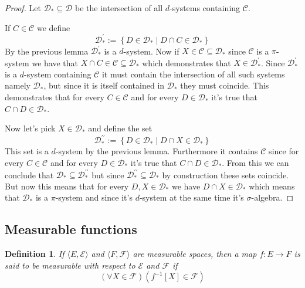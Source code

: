 \documentclass[a4paper]{amsart}
\newtheorem{deff}{Definition}
\newcommand{\pair}[2]{\langle #1, #2\rangle}
\begin{document}
\begin{proof}
    Let $\mathcal{D}_* \subseteq \mathcal{D}$ be the intersection of all $d$-systems containing  $\mathcal{C}$.
    
    If $C \in \mathcal{C}$ we define 
    $$ \mathcal{D}_*^\prime := \left\{ D \in \mathcal{D}_* \mid D \cap C \in \mathcal{D}_* \right\}$$
    By the previous lemma $\mathcal{D}_*^\prime$ is a $d$-system.
    Now if $X \in \mathcal{C}  \subseteq \mathcal{D}_* $ 
    since $\mathcal{C}$ is a $\pi$-system we have that 
    $X \cap C \in \mathcal{C} \subseteq \mathcal{D}_*$ which demonstrates that $X \in  \mathcal{D}_*^\prime$. 
    Since $\mathcal{D}_*^\prime$ is a $d$-system containing 
    $\mathcal{C}$ it must contain the intersection of all such 
    systems namely $\mathcal{D}_*$, but since it is itself 
    contained in $\mathcal{D}_*$ they must coincide. This 
    demonstrates that for every $C \in \mathcal{C}$ and for 
    every $D \in \mathcal{D}_*$ it's true that $C \cap D \in \mathcal{D}_*$.
    
    Now let's pick $X \in \mathcal{D}_*$ and define the set
    $$
    \mathcal{D}_*^{\prime\prime} := \left\{ D \in \mathcal{D}_* \mid D \cap X \in \mathcal{D}_* \right\}
    $$
    This set is a $d$-system by the previous lemma.
    Furthermore it contains $\mathcal{C}$ since for every $C \in \mathcal{C}$ and for 
    every $D \in \mathcal{D}_*$ it's true that $C \cap D \in \mathcal{D}_*$. From this we can conclude that 
    $\mathcal{D}_* \subseteq \mathcal{D}_*^{\prime\prime}$ but since $\mathcal{D}_*^{\prime\prime} \subseteq \mathcal{D}_*$ 
    by construction these sets coincide. But now this means 
    that for every $D, X \in \mathcal{D}_*$ we have $D \cap X \in \mathcal{D}_*$ which means that $\mathcal{D}_*$ is
    a $\pi$-system and since it's $d$-system at the same time
    it's $\sigma$-algebra.
\end{proof}




\subsection{Measurable functions}


\begin{deff}
    If $\pair{E}{\mathcal{E}}$ and $\pair{F}{\mathcal{F}}$ are 
    measurable spaces, then a map $f : E \longrightarrow F$ is 
    said to be measurable with respect to $\mathcal{E}$ and $\mathcal{F}$ if 
    $$
    \left(\forall X \in \mathcal{F}\right) \left( f^{-1}[X] \in \mathcal{F} \right)
    $$
\end{deff}
\end{document}
